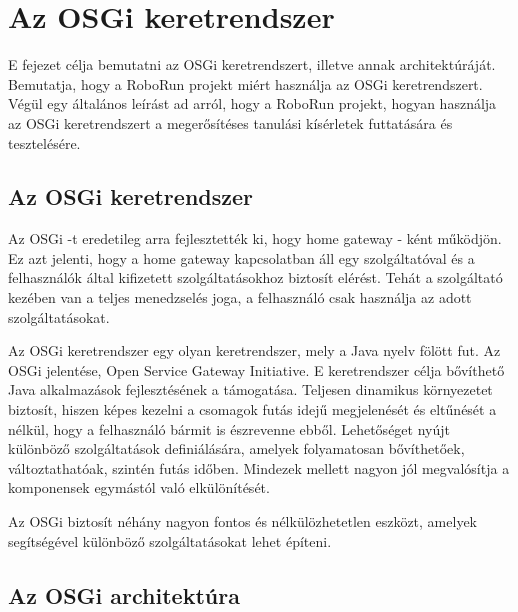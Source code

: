 \chapter{Az OSGi keretrendszer}\label{ch:MAT}

\begin{osszefoglal}
	E fejezet célja bemutatni az OSGi keretrendszert, illetve annak architektúráját. Bemutatja, hogy a RoboRun projekt miért használja az OSGi keretrendszert. Végül egy általános leírást ad arról, hogy a RoboRun projekt, hogyan használja az OSGi keretrendszert a megerősítéses tanulási kísérletek futtatására és tesztelésére.
\end{osszefoglal}


\section{Az OSGi keretrendszer}\label{sec:MAT:bev}
Az OSGi -t eredetileg arra fejlesztették ki, hogy home gateway - ként működjön. Ez azt jelenti, hogy a home gateway kapcsolatban áll egy szolgáltatóval és a felhasználók által kifizetett szolgáltatásokhoz biztosít elérést. Tehát a szolgáltató kezében  van a teljes menedzselés joga, a felhasználó csak használja az adott szolgáltatásokat. 

	Az OSGi keretrendszer egy olyan keretrendszer, mely a Java nyelv fölött fut. Az OSGi jelentése, Open Service Gateway Initiative. E keretrendszer célja bővíthető Java alkalmazások fejlesztésének a támogatása. Teljesen dinamikus környezetet biztosít, hiszen képes kezelni a csomagok futás idejű megjelenését és eltűnését a nélkül, hogy a felhasználó bármit is észrevenne ebből. Lehetőséget nyújt különböző szolgáltatások definiálására, amelyek folyamatosan bővíthetőek, változtathatóak, szintén futás időben. Mindezek mellett nagyon jól megvalósítja a komponensek egymástól való elkülönítését. 
	
	Az OSGi biztosít néhány nagyon fontos és nélkülözhetetlen eszközt, amelyek segítségével különböző szolgáltatásokat lehet építeni.   


\section{Az OSGi architektúra}\label{sec:MAT:muv}




